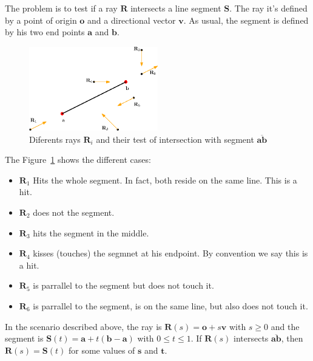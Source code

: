 The problem is to test if a ray $\mathbf{R}$ intersects a line segment $\mathbf{S}$.
The ray it's defined by a point of origin $\mathbf{o}$ and a directional vector $\mathbf{v}$.
As usual, the segment is defined by his two end points $\mathbf{a}$ and $\mathbf{b}$.

\begin{figure}[htb]
  \centering
  \includegraphics[width=0.50\textwidth]{img/segment2rays}
  \caption{Diferents rays $\mathbf{R}_i$ and their test of intersection with segment $\overline{\mathbf{a}\mathbf{b}}$}
  \label{fig:rays2seg}
\end{figure}

The Figure~\ref{fig:rays2seg} shows the different cases: 
\begin{itemize}
  \item $\mathbf{R}_1$ Hits the whole segment. In fact, both reside on the same line. This is a hit.
  \item $\mathbf{R}_2$ does not the segment.
  \item $\mathbf{R}_3$ hits the segment in the middle.
  \item $\mathbf{R}_4$ kisses (touches) the segmnet at his endpoint. By convention we say this is a hit.
  \item $\mathbf{R}_5$ is parrallel to the segment but does not touch it.
  \item $\mathbf{R}_6$ is parrallel to the segment, is on the same line, but also does not touch it.
\end{itemize}

In the scenario described above, the ray is $\mathbf{R}(s) = \mathbf{o} + s \mathbf{v}$ with $s \geq 0$ and the segment is $\mathbf{S}(t) = \mathbf{a} + t (\mathbf{b} - \mathbf{a})$ with $0 \leq t \leq 1$.
If $\mathbf{R}(s)$ intersects $\overline{\mathbf{a}\mathbf{b}}$, then $\mathbf{R}(s) = \mathbf{S}(t)$ for some values of $\mathbf{s}$ and $\mathbf{t}$.

